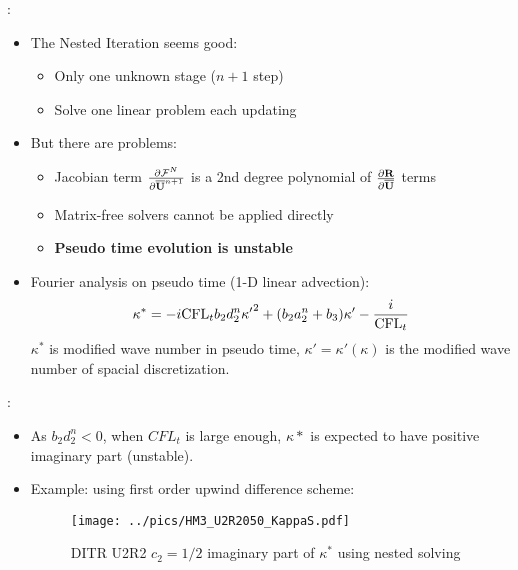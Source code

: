 \documentclass[aspectratio=169,serif]{beamer} %
\begin{document}
\begin{frame}{\secname: \subsecname}
  \begin{itemize}
    \item The Nested Iteration seems good:
          \begin{itemize}
            \item Only one unknown stage ($n+1$ step)
            \item Solve one linear problem each updating
          \end{itemize}
    \item But there are problems:
          \begin{itemize}
            \item Jacobian term $\pdv{\mathcal{F}^N}{\overline{\mathbf{U}}^{n+1}}$
                  is a 2nd degree polynomial of $\pdv{\mathbf{R}}{\overline{\mathbf{U}}}$ terms
            \item Matrix-free solvers cannot be applied directly
            \item {\bf Pseudo time evolution is unstable}
          \end{itemize}
    \item Fourier analysis on pseudo time (1-D linear advection):
          \begin{equation}
            \begin{aligned}
              \kappa^* =
              -i\text{CFL}_t b_2 d_2^n {\kappa'}^2
              + (b_2a_2^n + b_3) \kappa' - \frac{i}{\text{CFL}_t}
            \end{aligned}
            \label{eq:imagKsTauDITR_General}
          \end{equation}
          $\kappa^*$ is modified wave number in pseudo time, $\kappa'=\kappa'(\kappa)$
          is the modified wave number of spacial discretization.
  \end{itemize}
\end{frame}

\begin{frame}{\secname: \subsecname}
  \begin{itemize}
    \item As $b_2d_2^n < 0$, when $CFL_t$ is large enough,
          $\kappa*$ is expected to have positive imaginary part (unstable).
    \item Example: using first order upwind difference scheme:
          \begin{figure}[htbp]
            \centering
            \texttt{[image: ../pics/HM3\_U2R2050\_KappaS.pdf]}
            \caption[]{DITR U2R2 $c_2=1/2$ imaginary part of $\kappa^*$ using
              nested solving}
            \label{fig:HM3_U2R2050_KappaS}
          \end{figure}
  \end{itemize}
\end{frame}
\end{document}
